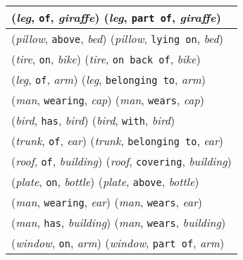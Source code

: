 \documentclass[runningheads]{llncs}
\begin{document}
{\begin{longtable}{ l }
(\textit{leg}, \texttt{of}, \textit{giraffe})  (\textit{leg}, \texttt{part of}, \textit{giraffe}) \\ \hline
(\textit{pillow}, \texttt{above}, \textit{bed})  (\textit{pillow}, \texttt{lying on}, \textit{bed}) \\ \hline
(\textit{tire}, \texttt{on}, \textit{bike})  (\textit{tire}, \texttt{on back of}, \textit{bike}) \\ \hline
(\textit{leg}, \texttt{of}, \textit{arm})  (\textit{leg}, \texttt{belonging to}, \textit{arm}) \\ \hline
(\textit{man}, \texttt{wearing}, \textit{cap})  (\textit{man}, \texttt{wears}, \textit{cap}) \\ \hline
(\textit{bird}, \texttt{has}, \textit{bird})  (\textit{bird}, \texttt{with}, \textit{bird}) \\ \hline
(\textit{trunk}, \texttt{of}, \textit{ear})  (\textit{trunk}, \texttt{belonging to}, \textit{ear}) \\ \hline
(\textit{roof}, \texttt{of}, \textit{building})  (\textit{roof}, \texttt{covering}, \textit{building}) \\ \hline
(\textit{plate}, \texttt{on}, \textit{bottle})  (\textit{plate}, \texttt{above}, \textit{bottle}) \\ \hline
(\textit{man}, \texttt{wearing}, \textit{ear})  (\textit{man}, \texttt{wears}, \textit{ear}) \\ \hline
(\textit{man}, \texttt{has}, \textit{building})  (\textit{man}, \texttt{wears}, \textit{building}) \\ \hline
(\textit{window}, \texttt{on}, \textit{arm})  (\textit{window}, \texttt{part of}, \textit{arm}) \\ \hline
\end{longtable}
}
\end{document}
